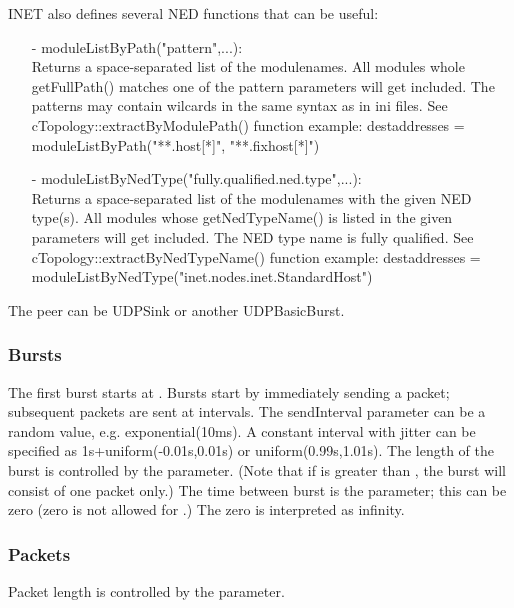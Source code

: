 INET also defines several NED functions that can be useful: 
\begin{itemize}
\item[-] moduleListByPath("pattern",...): \\
         Returns a space-separated list of the modulenames.
         All modules whole getFullPath() matches one of the pattern parameters will get included.
         The patterns may contain wilcards in the same syntax as in ini files.
         See cTopology::extractByModulePath() function
         example: destaddresses = moduleListByPath("**.host[*]", "**.fixhost[*]")
\item[-] moduleListByNedType("fully.qualified.ned.type",...): \\ 
         Returns a space-separated list of the modulenames with the given NED type(s).
         All modules whose getNedTypeName() is listed in the given parameters will get included.
         The NED type name is fully qualified.
         See cTopology::extractByNedTypeName() function
         example: destaddresses = moduleListByNedType("inet.nodes.inet.StandardHost")
\end{itemize}

The peer can be UDPSink or another UDPBasicBurst.

\subsubsection*{Bursts}

The first burst starts at . Bursts start by immediately sending 
a packet; subsequent packets are sent at  intervals. The 
sendInterval parameter can be a random value, e.g. exponential(10ms).
A constant interval with jitter can be specified as 1s+uniform(-0.01s,0.01s)
or uniform(0.99s,1.01s). The length of the burst is controlled by the
 parameter. (Note that if  is greater than 
, the burst will consist of one packet only.) The time between
burst is the  parameter; this can be zero (zero is not
allowed for .) The zero  is interpreted as infinity.

\subsubsection*{Packets}

Packet length is controlled by the  parameter.


